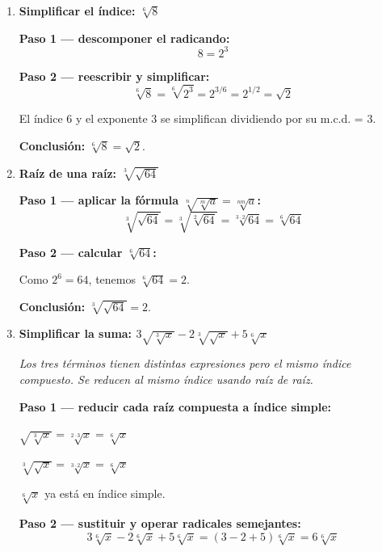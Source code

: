 \documentclass[11pt, letterpaper]{article}
\begin{document}
\begin{tcolorbox}[examplebox, title={Ejemplos}]
\begin{enumerate}[label=\textbf{Ej. \arabic*.}, leftmargin=*, itemsep=18pt]
\textit{Se multiplica el índice por 2; el radicando debe elevarse al mismo factor.}

\textbf{Paso 1 — amplificar el índice:}
$$\sqrt[3]{5} = 5^{1/3} = 5^{2/6} = \sqrt[6]{5^2} = \sqrt[6]{25}$$

\textbf{Conclusión:} $\sqrt[3]{5} = \sqrt[6]{25}$.

\item \textbf{Simplificar el índice: $\sqrt[6]{8}$}

\textbf{Paso 1 — descomponer el radicando:}
$$8 = 2^3$$

\textbf{Paso 2 — reescribir y simplificar:}
$$\sqrt[6]{8} = \sqrt[6]{2^3} = 2^{3/6} = 2^{1/2} = \sqrt{2}$$

El índice 6 y el exponente 3 se simplifican dividiendo por su m.c.d. = 3.

\textbf{Conclusión:} $\sqrt[6]{8} = \sqrt{2}$.

\item \textbf{Raíz de una raíz: $\sqrt[3]{\sqrt{64}}$}

\textbf{Paso 1 — aplicar la fórmula $\sqrt[n]{\sqrt[m]{a}} = \sqrt[nm]{a}$:}
$$\sqrt[3]{\sqrt{64}} = \sqrt[3]{\sqrt[2]{64}} = \sqrt[3 \cdot 2]{64} = \sqrt[6]{64}$$

\textbf{Paso 2 — calcular $\sqrt[6]{64}$:}

Como $2^6 = 64$, tenemos $\sqrt[6]{64} = 2$.

\textbf{Conclusión:} $\sqrt[3]{\sqrt{64}} = 2$.

\item \textbf{Simplificar la suma: $3\sqrt{\sqrt[3]{x}}-2\sqrt[3]{\sqrt{x}}+5\sqrt[6]{x}$}

\textit{Los tres términos tienen distintas expresiones pero el mismo índice compuesto. Se reducen al mismo índice usando raíz de raíz.}

\textbf{Paso 1 — reducir cada raíz compuesta a índice simple:}

$\sqrt{\sqrt[3]{x}} = \sqrt[2\cdot 3]{x} = \sqrt[6]{x}$

$\sqrt[3]{\sqrt{x}} = \sqrt[3 \cdot 2]{x} = \sqrt[6]{x}$

$\sqrt[6]{x}$ ya está en índice simple.

\textbf{Paso 2 — sustituir y operar radicales semejantes:}
$$3\sqrt[6]{x} - 2\sqrt[6]{x} + 5\sqrt[6]{x} = (3-2+5)\sqrt[6]{x} = 6\sqrt[6]{x}$$


\end{enumerate}
\end{tcolorbox}
\end{document}

